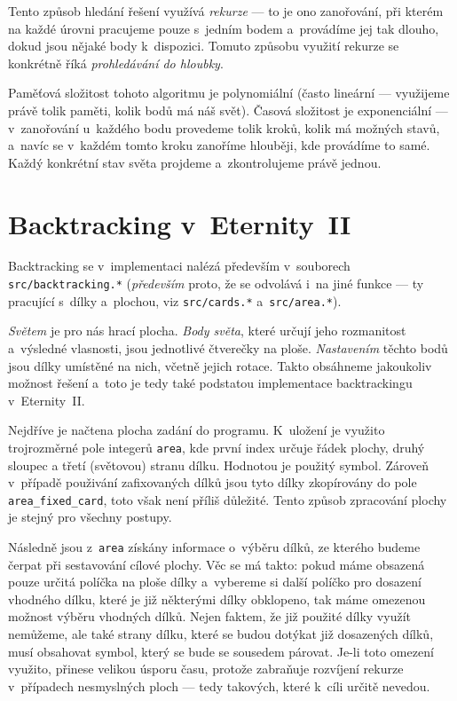 \documentclass[11pt, titlepage]{report}
\begin{document}
Tento způsob hledání řešení využívá \emph{rekurze} --- to je ono zanořování, při kterém na každé úrovni pracujeme pouze s~jedním bodem a~provádíme jej tak dlouho, dokud jsou nějaké body k~dispozici. Tomuto způsobu využití rekurze se konkrétně říká \emph{prohledávání do hloubky}.

Paměťová složitost tohoto algoritmu je polynomiální (často lineární --- využijeme právě tolik paměti, kolik bodů má náš svět). Časová složitost je exponenciální --- v~zanořování u~každého bodu provedeme tolik kroků, kolik má možných stavů, a~navíc se v~každém tomto kroku zanoříme hlouběji, kde provádíme to samé. Každý konkrétní stav světa projdeme a~zkontrolujeme právě jednou.

\section{Backtracking v~Eternity~II}
\label{sec:bck-et}

Backtracking se v~implementaci nalézá především v~souborech \texttt{src/backtracking.*} (\emph{především} proto, že se odvolává i~na jiné funkce --- ty pracující s~dílky a~plochou, viz \texttt{src/cards.*} a~\texttt{src/area.*}).

\emph{Světem} je pro nás hrací plocha. \emph{Body světa}, které určují jeho rozmanitost a~výsledné vlasnosti, jsou jednotlivé čtverečky na ploše. \emph{Nastavením} těchto bodů jsou dílky umístěné na nich, včetně jejich rotace. Takto obsáhneme jakoukoliv možnost řešení a~toto je tedy také podstatou implementace backtrackingu v~Eternity~II.

Nejdříve je načtena plocha zadání do programu. K~uložení je využito trojrozměrné pole integerů \texttt{area}, kde první index určuje řádek plochy, druhý sloupec a třetí (světovou) stranu dílku. Hodnotou je použitý symbol. Zároveň v~případě použivání zafixovaných dílků jsou tyto dílky zkopírovány do pole \texttt{area\_fixed\_card}, toto však není příliš důležité. Tento způsob zpracování plochy je stejný pro všechny postupy.

Následně jsou z~\texttt{area} získány informace o~výběru dílků, ze kterého budeme čerpat při sestavování cílové plochy. Věc se má takto: pokud máme obsazená pouze určitá políčka na ploše dílky a~vybereme si další políčko pro dosazení vhodného dílku, které je již některými dílky obklopeno, tak máme omezenou možnost výběru vhodných dílků. Nejen faktem, že již použité dílky využít nemůžeme, ale také strany dílku, které se budou dotýkat již dosazených dílků, musí obsahovat symbol, který se bude se sousedem párovat. Je-li toto omezení využito, přinese velikou úsporu času, protože zabraňuje rozvíjení rekurze v~případech nesmyslných ploch --- tedy takových, které k~cíli určitě nevedou.
\end{document}

